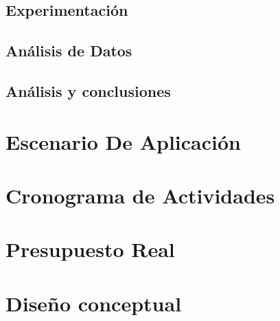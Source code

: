 \documentclass{extbook}
\begin{document}
\subsection{Experimentación}

\subsection{Análisis de Datos}

\subsection{Análisis y conclusiones}

\section{Escenario De Aplicación}

\section{Cronograma de Actividades}

\section{Presupuesto Real}

\section{Diseño conceptual}


\end{document}
